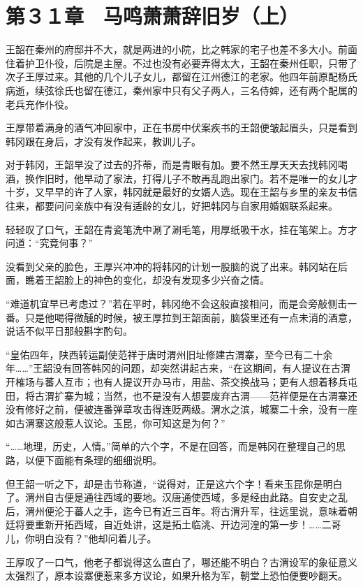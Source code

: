 \section{第３１章　马鸣萧萧辞旧岁（上）}

王韶在秦州的府邸并不大，就是两进的小院，比之韩家的宅子也差不多大小。前面住着护卫仆役，后院是主屋。不过也没有必要弄得太大，王韶在秦州任职，只带了次子王厚过来。其他的几个儿子女儿，都留在江州德江的老家。他四年前原配杨氏病逝，续弦徐氏也留在德江，秦州家中只有父子两人，三名侍婢，还有两个配属的老兵充作仆役。

王厚带着满身的酒气冲回家中，正在书房中伏案疾书的王韶便皱起眉头，只是看到韩冈跟在身后，才没有发作起来，教训儿子。

对于韩冈，王韶早没了过去的芥蒂，而是青眼有加。要不然王厚天天去找韩冈喝酒，换作旧时，他早动了家法，打得儿子不敢再乱跑出家门。若不是唯一的女儿才十岁，又早早的许了人家，韩冈就是最好的女婿人选。现在王韶与乡里的亲友书信往来，都要问问亲族中有没有适龄的女儿，好把韩冈与自家用婚姻联系起来。

轻轻叹了口气，王韶在青瓷笔洗中涮了涮毛笔，用厚纸吸干水，挂在笔架上。方才问道：“究竟何事？”

没看到父亲的脸色，王厚兴冲冲的将韩冈的计划一股脑的说了出来。韩冈站在后面，瞧着王韶脸上的神色的变化，却没有发现多少兴奋之情。

“难道机宜早已考虑过？”若在平时，韩冈绝不会这般直接相问，而是会旁敲侧击一番。只是他喝得微醺的时候，被王厚拉到王韶面前，脑袋里还有一点未消的酒意，说话不似平日那般斟字酌句。

“皇佑四年，陕西转运副使范祥于唐时渭州旧址修建古渭寨，至今已有二十余年……”王韶没有回答韩冈的问题，却突然讲起古来，“在这期间，有人提议在古渭开榷场与蕃人互市；也有人提议开办马市，用盐、茶交换战马；更有人想着移兵屯田，将古渭扩寨为城；当然，也不是没有人想要废弃古渭——范祥便是在古渭寨还没有修好之前，便被连番弹章攻击得连贬两级。渭水之滨，城寨二十余，没有一座如古渭寨这般惹人议论。玉昆，你可知这是为何？”

“……地理，历史，人情。”简单的六个字，不是在回答，而是韩冈在整理自己的思路，以便下面能有条理的细细说明。

但王韶一听之下，却是击节称道，“说得对，正是这六个字！看来玉昆你是明白了。渭州自古便是通往西域的要地。汉唐通使西域，多是经由此路。自安史之乱后，渭州便沦于蕃人之手，迄今已有近三百年。将古渭升军，往远里说，意味着朝廷将要重新开拓西域，自近处讲，这是拓土临洮、开边河湟的第一步！……二哥儿，你明白没有？”他却问着儿子。

王厚叹了一口气，他老子都说得这么直白了，哪还能不明白？古渭设军的象征意义太强烈了，原本设寨便惹来多方议论，如果升格为军，朝堂上恐怕便要吵翻天。


